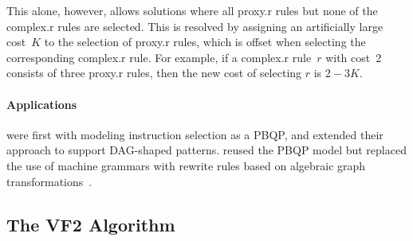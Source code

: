 This alone, however, allows \glspl{solution} where all \gls{proxy.r}
\glspl{rule} but none of the \gls{complex.r} \glspl{rule} are selected.
%
This is resolved by assigning an artificially large cost~$K$ to the selection of
\gls{proxy.r} \glspl{rule}, which is offset when selecting the corresponding
\gls{complex.r} \gls{rule}.
%
For example, if a \gls{complex.r} \gls{rule}~$r$ with cost~\num{2} consists of
three \gls{proxy.r} \glspl{rule}, then the new cost of selecting $r$ is \mbox{$2
  - 3K$}.


\paragraph{Applications}

\textcite{EcksteinEtAl:2003} were first with modeling \gls{instruction
  selection} as a \gls{PBQP}, and \textcite{EbnerEtAl:2008} extended their
approach to support \gls{DAG}-shaped \glspl{pattern}.
%
\textcite{BuchwaldZwinkau:2010} reused the \gls{PBQP} model but replaced the use
of \glspl{machine grammar} with rewrite rules based on algebraic graph
transformations~\cite{LoweEhrig:1991}.


\subsection{The VF2 Algorithm}


